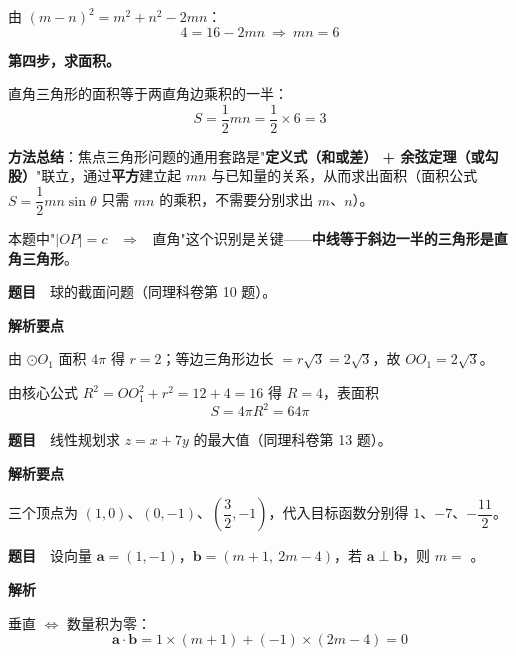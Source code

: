 由 $(m-n)^{2}=m^{2}+n^{2}-2mn$：
\[4=16-2mn\ \Longrightarrow\ mn=6\]

\textbf{第四步，求面积。}

直角三角形的面积等于两直角边乘积的一半：
\[S=\frac12mn=\frac12\times6=3\]


\begin{gktip}
\textbf{方法总结}：焦点三角形问题的通用套路是"\textbf{定义式（和或差） + 余弦定理（或勾股）}"联立，通过\textbf{平方}建立起 $mn$ 与已知量的关系，从而求出面积（面积公式 $S=\dfrac12mn\sin\theta$ 只需 $mn$ 的乘积，不需要分别求出 $m$、$n$）。

本题中"$|OP|=c$ ~$\Longrightarrow$~ 直角"这个识别是关键——\textbf{中线等于斜边一半的三角形是直角三角形}。
\end{gktip}

\par\medskip


\textbf{题目}　球的截面问题（同理科卷第 10 题）。

\textbf{解析要点}

由 $\odot O_1$ 面积 $4\pi$ 得 $r=2$；等边三角形边长 $=r\sqrt3=2\sqrt3$，故 $OO_1=2\sqrt3$。

由核心公式 $R^{2}=OO_1^{2}+r^{2}=12+4=16$ 得 $R=4$，表面积
\[S=4\pi R^{2}=64\pi\]


\par\medskip



\textbf{题目}　线性规划求 $z=x+7y$ 的最大值（同理科卷第 13 题）。

\textbf{解析要点}

三个顶点为 $(1,0)$、$(0,-1)$、$\left(\dfrac32,-1\right)$，代入目标函数分别得 $1$、$-7$、$-\dfrac{11}2$。


\par\medskip


\textbf{题目}　设向量 $\boldsymbol a=(1,-1)$，$\boldsymbol b=(m+1,\ 2m-4)$，若 $\boldsymbol a\perp\boldsymbol b$，则 $m=$ \gkblank{}。

\textbf{解析}

垂直 $\iff$ 数量积为零：
\[\boldsymbol a\cdot\boldsymbol b=1\times(m+1)+(-1)\times(2m-4)=0\]

